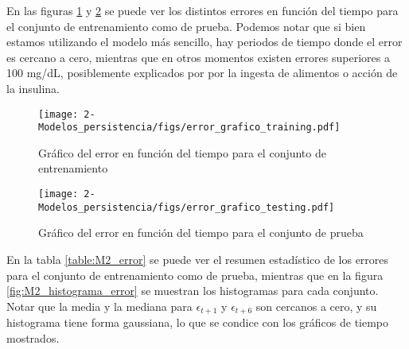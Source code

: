 En las figuras \ref{fig:M2_error_train} y \ref{fig:M2_error_test} se puede ver los distintos errores en función del tiempo para el conjunto de entrenamiento como de prueba. Podemos notar que si bien estamos utilizando el modelo más sencillo, hay periodos de tiempo donde el error es cercano a cero, mientras que en otros momentos existen errores superiores a 100 mg/dL, posiblemente explicados por por la ingesta de alimentos o acción de la insulina.

\begin{figure}[H]
	\centering
	\texttt{[image: 2-Modelos\_persistencia/figs/error\_grafico\_training.pdf]}
	\caption{Gráfico del error en función del tiempo para el conjunto de entrenamiento}
	\label{fig:M2_error_train}
\end{figure}

\begin{figure}[H]
	\centering
	\texttt{[image: 2-Modelos\_persistencia/figs/error\_grafico\_testing.pdf]}
	\caption{Gráfico del error en función del tiempo para el conjunto de prueba}
	\label{fig:M2_error_test}
\end{figure}


En la tabla \ref{table:M2_error} se puede ver el resumen estadístico de los errores para el conjunto de entrenamiento como de prueba, mientras que en la figura \ref{fig:M2_histograma_error} se muestran los histogramas para cada conjunto. Notar que la media y la mediana para $\epsilon_{t+1}$ y $\epsilon_{t+6}$ son cercanos a cero, y su histograma tiene forma gaussiana, lo que se condice con los gráficos de tiempo mostrados.

